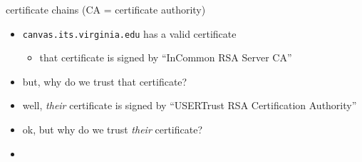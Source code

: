 \begin{frame}{certificate chains (CA = certificate authority)}
    \begin{itemize}
    \item \texttt{canvas.its.virginia.edu} has a valid certificate
        \begin{itemize}
        \item that certificate is signed by ``InCommon RSA Server CA''
        \end{itemize}
    \item<2-> but, why do we trust that certificate?
    \item<3-> well, \textit{their} certificate is signed by ``USERTrust RSA Certification Authority''
    \item<4-> ok, but why do we trust \textit{their} certificate?
    \vspace{.5cm}
    \item<5-> 
    \end{itemize}
\end{frame}



